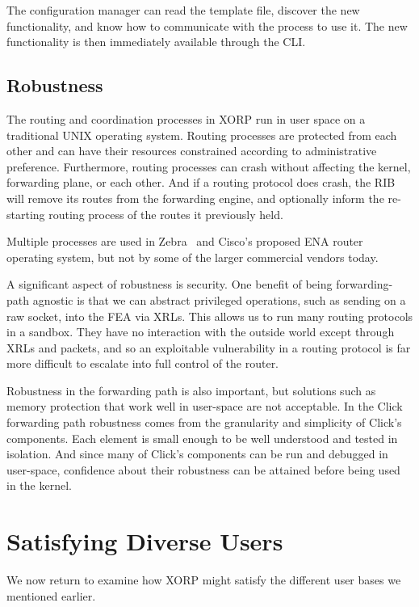 The configuration manager can read the template file, discover the new
functionality, and know how to communicate with the process to use it.
The new functionality is then immediately available through the CLI.

\subsection{Robustness}

The routing and coordination processes in XORP run in user space on a
traditional UNIX operating system.  Routing processes are protected
from each other and can have their resources constrained according to
administrative preference.  Furthermore, routing processes can crash
without affecting the kernel, forwarding plane, or each other.  And if
a routing protocol does crash, the RIB will remove its routes
from the forwarding engine, and optionally inform the re-starting
routing process of the routes it previously held.

Multiple processes are used in Zebra~\cite{zebra} and Cisco's proposed ENA
router operating system, but not by some of the larger
commercial vendors today.

A significant aspect of robustness is security.  One benefit of
being forwarding-path agnostic is that we can abstract
privileged operations, such as sending on a raw socket, into
the FEA via XRLs.  This allows us to run many routing protocols
in a sandbox. They have no interaction with the outside world except
through XRLs and packets, and so an exploitable vulnerability in a routing
protocol is far more difficult to escalate into full control of the
router.

Robustness in the forwarding path is also important, but solutions
such as memory protection that work well in user-space are not
acceptable.  In the Click forwarding path robustness comes from the
granularity and simplicity of Click's components.  Each element is
small enough to be well understood and tested in isolation.  And since
many of Click's components can be run and debugged in user-space,
confidence about their robustness can be attained before being used in
the kernel.

\section{Satisfying Diverse Users}

We now return to examine how XORP might satisfy the different user
bases we mentioned earlier.

